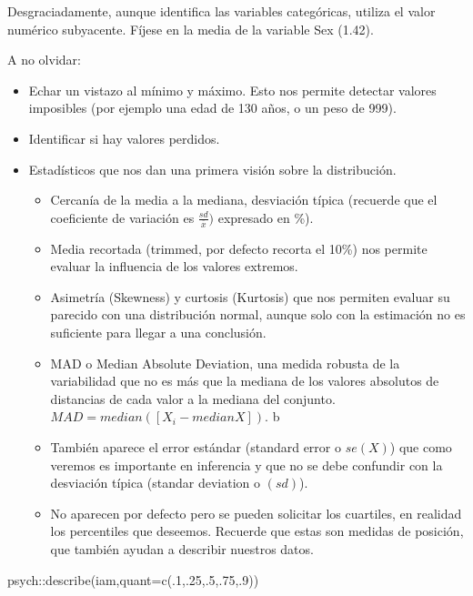 \documentclass[
  letterpaper,
  DIV=11,
  numbers=noendperiod]{scrreprt}
\newenvironment{Shaded}{\begin{snugshade}}{\end{snugshade}}
\newcommand{\AttributeTok}[1]{\textcolor[rgb]{0.40,0.45,0.13}{#1}}
\newcommand{\DecValTok}[1]{\textcolor[rgb]{0.68,0.00,0.00}{#1}}
\newcommand{\FunctionTok}[1]{\textcolor[rgb]{0.28,0.35,0.67}{#1}}
\newcommand{\NormalTok}[1]{\textcolor[rgb]{0.00,0.23,0.31}{#1}}
\newcommand{\SpecialCharTok}[1]{\textcolor[rgb]{0.37,0.37,0.37}{#1}}
\providecommand{\tightlist}{%
  \setlength{\itemsep}{0pt}\setlength{\parskip}{0pt}}\usepackage{longtable,booktabs,array}
\begin{document}
Desgraciadamente, aunque identifica las variables categóricas, utiliza
el valor numérico subyacente. Fíjese en la media de la variable Sex
(1.42).

A no olvidar:

\begin{itemize}
\tightlist
\item
  Echar un vistazo al mínimo y máximo. Esto nos permite detectar valores
  imposibles (por ejemplo una edad de 130 años, o un peso de 999).
\item
  Identificar si hay valores perdidos.
\item
  Estadísticos que nos dan una primera visión sobre la distribución.

  \begin{itemize}
  \tightlist
  \item
    Cercanía de la media a la mediana, desviación típica (recuerde que
    el coeficiente de variación es \(\frac{sd}{\overline{x}})\)
    expresado en \%).
  \item
    Media recortada (trimmed, por defecto recorta el 10\%) nos permite
    evaluar la influencia de los valores extremos.
  \item
    Asimetría (Skewness) y curtosis (Kurtosis) que nos permiten evaluar
    su parecido con una distribución normal, aunque solo con la
    estimación no es suficiente para llegar a una conclusión.
  \item
    MAD o Median Absolute Deviation, una medida robusta de la
    variabilidad que no es más que la mediana de los valores absolutos
    de distancias de cada valor a la mediana del conjunto.
    \(MAD=median([X_i-median{X}])\). b
  \item
    También aparece el error estándar (standard error o \(se(X)\)) que
    como veremos es importante en inferencia y que no se debe confundir
    con la desviación típica (standar deviation o \((sd)\)).
  \item
    No aparecen por defecto pero se pueden solicitar los cuartiles, en
    realidad los percentiles que deseemos. Recuerde que estas son
    medidas de posición, que también ayudan a describir nuestros datos.
  \end{itemize}
\end{itemize}

\begin{Shaded}
\begin{Highlighting}[]
\NormalTok{psych}\SpecialCharTok{::}\FunctionTok{describe}\NormalTok{(iam,}\AttributeTok{quant=}\FunctionTok{c}\NormalTok{(.}\DecValTok{1}\NormalTok{,.}\DecValTok{25}\NormalTok{,.}\DecValTok{5}\NormalTok{,.}\DecValTok{75}\NormalTok{,.}\DecValTok{9}\NormalTok{))}
\end{Highlighting}
\end{Shaded}
\end{document}
